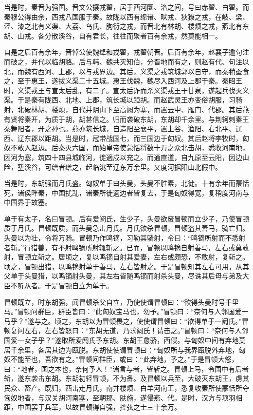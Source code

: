 \documentclass[12pt,UTF8]{ctexbook}
\begin{document}
当是时，秦晋为强国。晋文公攘戎翟，居于西河圜、洛之间，号曰赤翟、白翟。而秦穆公得由余，西戎八国服于秦。故陇以西有绵诸、畎戎、狄獠之戎，在岐、梁、泾、漆之北有义渠、大荔、乌氏、朐衍之戎，而晋北有林胡、楼烦之戎，燕北有东胡、山戎。各分散溪谷，自有君长，往往而聚者百有余戎，然莫能相一。



自是之后百有余年，晋悼公使魏绛和戎翟，戎翟朝晋。后百有余年，赵襄子逾句注而破之，并代以临胡貉。后与韩、魏共灭知伯，分晋地而有之，则赵有代、句注以北，而魏有西河、上郡，以与戎界边。其后，义渠之戎筑城郭以自守，而秦稍蚕食之，至于惠王，遂拔义渠二十五城。惠王伐魏，魏尽入西河及上郡于秦。秦昭王时，义渠戎王与宣太后乱，有二子。宣太后诈而杀义渠戎王于甘泉，遂起兵伐灭义渠。于是秦有陇西、北地、上郡，筑长城以距胡。而赵武灵王亦变俗胡服，习骑射，北破林胡、楼烦，自代并阴山下至高阙为塞，而置云中、雁门、代郡。其后燕有贤将秦开，为质于胡，胡甚信之。归而袭破东胡，东胡却千余里。与荆轲刺秦王秦舞阳者，开之孙也。燕亦筑长城，自造阳至襄平，置上谷、渔阳、右北平、辽西、辽东郡以距胡。当是时，冠带战国七，而三国边于匈奴。其后赵将李牧时，匈奴不敢入赵边。后秦灭六国，而始皇帝使蒙恬将数十万之众北击胡，悉收河南地，因河为塞，筑四十四县城临河，徙適戍以充之。而通直道，自九原至云阳，因边山险，堑溪谷，可缮者缮之，起临洮至辽东万余里。又度河据阳山北假中。



当是时，东胡强而月氏盛。匈奴单于曰头曼，头曼不胜素，北徙。十有余年而蒙恬死，诸侯畔秦，中国扰乱，诸秦所徙適边者皆复去，于是匈奴得宽，复稍度河南与中国界于故塞。



单于有太子，名曰冒顿。后有爱阏氏，生少子，头曼欲废冒顿而立少子，乃使冒顿质于月氏。冒顿既质，而头曼急击月氏。月氏欲杀冒顿，冒顿盗其善马，骑亡归。头曼以为壮，令将万骑。冒顿乃作鸣镝，习勒其骑射，令曰：“鸣镝所射而不悉射者斩。”行猎兽，有不射鸣镝所射辄斩之。已而，冒顿以鸣镝自射善马，左右或莫敢射，冒顿立斩之。居顷之，复以鸣镝自射其爱妻，左右或颇恐，不敢射，复斩之。顷之，冒顿出猎，以鸣镝射单于善马，左右皆射之。于是冒顿知其左右可用，从其父单于头曼猎，以鸣镝射头曼，其左右皆随鸣镝而射杀头曼，尽诛其后母与弟及大臣不听从者。于是冒顿自立为单于。



冒顿既立，时东胡强，闻冒顿杀父自立，乃使使谓冒顿曰：“欲得头曼时号千里马。”冒顿问群臣，群臣皆曰：“此匈奴宝马也，勿予。”冒顿曰：“奈何与人邻国爱一马乎？”遂与之。顷之，东胡以为冒顿畏之，使使谓冒顿曰：“欲得单于一阏氏。”冒顿复问左右，左右皆怒曰：“东胡无道，乃求阏氏！请击之。”冒顿曰：“奈何与人邻国爱一女子乎？”遂取所爱阏氏予东胡。东胡王愈骄，西侵。与匈奴中间有弃地莫居千余里，各居其边为瓯脱。东胡使使谓冒顿曰：“匈奴所与我界瓯脱外弃地，匈奴不能至也，吾欲有之。”冒顿问群臣，或曰：“此弃地，予之。”于是冒顿大怒，曰：“地者，国之本也，奈何予人！”诸言与者，皆斩之。冒顿上马，令国中有后者斩，遂东袭击东胡。东胡初轻冒顿，不为备。及冒顿以兵至，大破灭东胡王，虏其民众、畜产。既归，西击走月氏，南并楼烦、白羊河南王，悉复收秦所使蒙恬所夺匈奴地者，与汉关胡河南塞，至朝那、肤施，遂侵燕、代。是时，汉方与项羽相距，中国罢于兵革，以故冒顿得自强，控弦之士三十余万。
\end{document}
